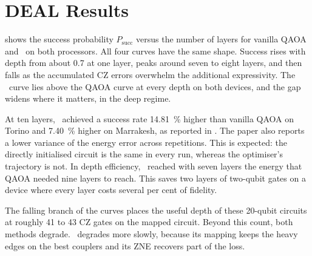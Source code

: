 \section{DEAL Results}\label{sec:nisq:deal-results}

 shows the success probability $P_{\mathrm{succ}}$ versus the number of layers for vanilla QAOA and \deal\ on both processors. All four curves have the same shape. Success rises with depth from about 0.7 at one layer, peaks around seven to eight layers, and then falls as the accumulated CZ errors overwhelm the additional expressivity. The \deal\ curve lies above the QAOA curve at every depth on both devices, and the gap widens where it matters, in the deep regime.

At ten layers, \deal\ achieved a success rate \SI{14.81}{\percent} higher than vanilla QAOA on Torino and \SI{7.40}{\percent} higher on Marrakesh, as reported in \cite{guo2025deal}. The paper also reports a lower variance of the energy error across repetitions. This is expected: the directly initialised circuit is the same in every run, whereas the optimiser's trajectory is not. In depth efficiency, \deal\ reached with seven layers the energy that QAOA needed nine layers to reach. This saves two layers of two-qubit gates on a device where every layer costs several per cent of fidelity.

The falling branch of the curves places the useful depth of these 20-qubit circuits at roughly 41 to 43 CZ gates on the mapped circuit. Beyond this count, both methods degrade. \deal\ degrades more slowly, because its mapping keeps the heavy edges on the best couplers and its ZNE recovers part of the loss.

